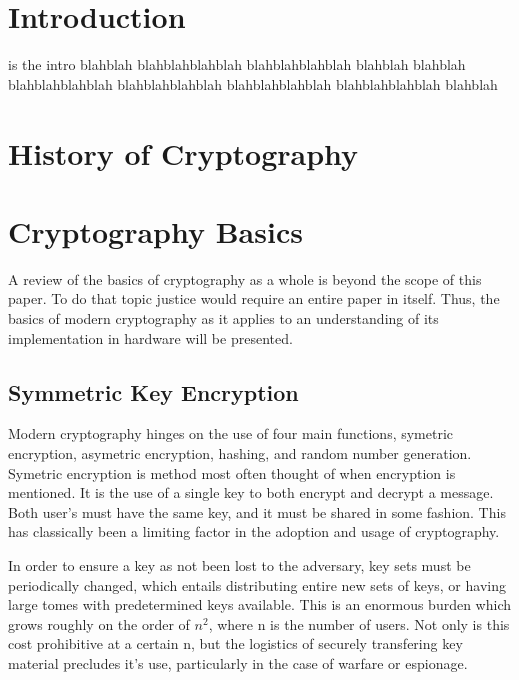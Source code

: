 \documentclass[journal]{IEEEtran}
\begin{document}
\section{Introduction}
% 
% 
% 
% 
 is the intro blahblah blahblahblahblah blahblahblahblah blahblah
blahblah blahblahblahblah blahblahblahblah blahblahblahblah blahblahblahblah blahblah


\section{History of Cryptography}



\section{Cryptography Basics}

A review of the basics of cryptography as a whole is beyond the scope of this paper.  To do that topic justice would require an entire paper in itself.  Thus, the basics of modern cryptography as it applies to an understanding of its implementation in hardware will be presented.

\subsection{Symmetric Key Encryption}

Modern cryptography hinges on the use of four main functions, symetric encryption, asymetric encryption, hashing, and random number generation.  Symetric encryption is method most often thought of when encryption is mentioned.  It is the use of a single key to both encrypt and decrypt a message.  Both user's must have the same key, and it must be shared in some fashion.  This has classically been a limiting factor in the adoption and usage of cryptography.  

In order to ensure a key as not been lost to the adversary, key sets must be periodically changed, which entails distributing entire new sets of keys, or having large tomes with predetermined keys available.  This is an enormous burden which grows roughly on the order of $n^2$, where n is the number of users.  Not only is this cost prohibitive at a certain n, but the logistics of securely transfering key material precludes it's use, particularly in the case of warfare or espionage.
\end{document}
